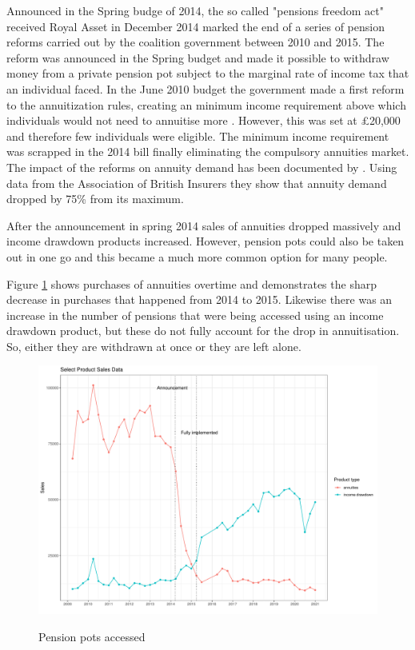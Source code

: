 \documentclass[12pt]{article}
\begin{document}
Announced in the Spring budge of 2014, the so called "pensions freedom act" received Royal Asset in December 2014 marked the end of a series
of pension reforms carried out by the coalition government between 2010 and 2015. The reform was announced
in the Spring budget and made it possible to withdraw money from a private pension pot subject to the
marginal rate of income tax that an individual faced. In the June 2010 budget the government made a first
reform to the annuitization rules, creating an minimum income requirement above which individuals would not need to
annuitise more \cite{finance_act_hmt_2011}. However, this was set at £20,000 and therefore few individuals
were eligible. The minimum income requirement was scrapped in the 2014 bill finally eliminating the
compulsory annuities market. The impact of the reforms on annuity demand has been documented by \cite{cannon_et_al_nier_2016}.
Using data from the Association of British Insurers they show that annuity demand dropped by 75\% from
its maximum.

After the announcement in spring 2014 sales of annuities dropped massively and income drawdown products increased.
However, pension pots could also be taken out in one go and this became a much more common option for many people.

Figure \ref{fig:annovertime} shows purchases of annuities overtime and demonstrates the sharp decrease
in purchases that happened from 2014 to 2015. Likewise there was an increase in the number of pensions that were
being accessed using an income drawdown product, but these do not fully account for the drop in annuitisation. So,
either they are withdrawn at once or they are left alone.



\begin{figure}[h]
  \caption{Pension pots accessed}
  \centering
  \includegraphics[width=0.7\columnwidth]{figures/annuity_overtime.pdf}
  \label{fig:annovertime}
\end{figure}
\end{document}
